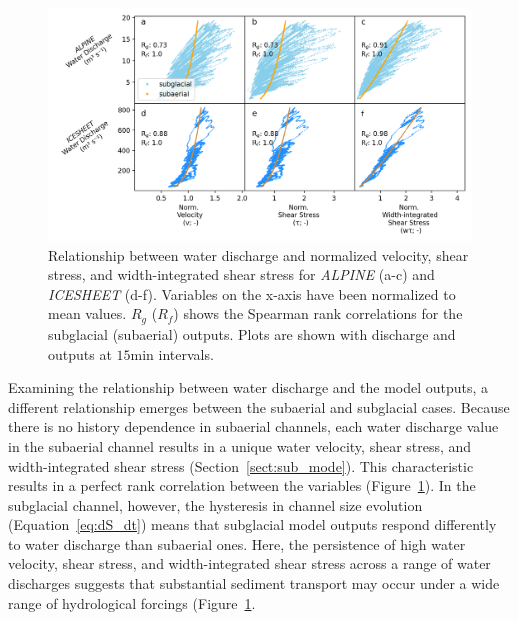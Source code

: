 \documentclass[draft]{agujournal2019}
\newcommand{\alpine}{\textit{ALPINE}}
\newcommand{\icesheet}{\textit{ICESHEET}}
\newcommand{\unit}[1]{$\mathrm{#1}$}
\begin{document}
\begin{figure}[h]
  \centering
  \includegraphics[width=0.9\linewidth]{Fig3.png}
  \caption{
    Relationship between water discharge and normalized velocity, shear stress, and width-integrated shear stress for \alpine{} (a-c) and \icesheet{} (d-f).
    Variables on the x-axis have been normalized to mean values.
    $R_g$ ($R_f$) shows the Spearman rank correlations for the subglacial (subaerial) outputs.
    Plots are shown with discharge and outputs at $15$\unit{min} intervals.
  }
  \label{fig:Qw_vari}
\end{figure}

Examining the relationship between water discharge and the model outputs, a different relationship emerges between the subaerial and subglacial cases.
Because there is no history dependence in  subaerial channels, each water discharge value in the subaerial channel results in a unique water velocity, shear stress, and width-integrated shear stress (Section~\ref{sect:sub_mode}).
This characteristic results in a perfect rank correlation between the variables (Figure~\ref{fig:Qw_vari}).
In the subglacial channel, however, the hysteresis in channel size evolution (Equation~\ref{eq:dS_dt}) means that subglacial model outputs respond differently to water discharge than subaerial ones.
Here, the persistence of high water velocity, shear stress, and width-integrated shear stress across a range of water discharges suggests that substantial sediment transport may occur under a wide range of hydrological forcings (Figure~\ref{fig:Qw_vari}.
\end{document}
